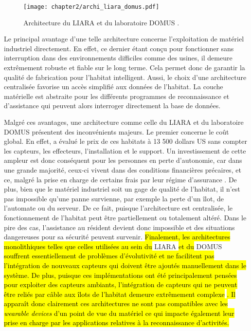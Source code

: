 \begin{figure}[H]
	\centering
	\texttt{[image: chapter2/archi\_liara\_domus.pdf]}
	\caption[Architecture du \acs{LIARA} et du laboratoire \acs{DOMUS}.]{Architecture du \acs{LIARA} \citep{Bouchard2014} et du laboratoire \acs{DOMUS} \citep{Giroux2009}.}
	\label{fig:archi_liara_domus}
\end{figure}

Le principal avantage d'une telle architecture concerne l'exploitation de matériel industriel directement. En effet, ce dernier étant conçu pour fonctionner sans interruption dans des environnements difficiles comme des usines, il demeure extrêmement robuste et fiable sur le long terme. Cela permet donc de garantir la qualité de fabrication pour l'habitat intelligent. Aussi, le choix d'une architecture centralisée favorise un accès simplifié aux données de l'habitat. La couche matérielle est abstraite pour les différents programmes de reconnaissance et d'assistance qui peuvent alors interroger directement la base de données.

Malgré ces avantages, une architecture comme celle du \acs{LIARA} et du laboratoire \acs{DOMUS} présentent des inconvénients majeurs. Le premier concerne le coût global. En effet, \cite{Plantevin2018a} a évalué le prix de ces habitats à 13 500 dollars US sans compter les capteurs, les effecteurs, l'installation et le support. Un investissement de cette ampleur est donc conséquent pour les personnes en perte d'autonomie, car dans une grande majorité, ceux-ci vivent dans des conditions financières précaires, et ce, malgré la prise en charge de certains frais par leur régime d'assurance \citep{AlzheimersAssociation2018}. De plus, bien que le matériel industriel soit un gage de qualité de l'habitat, il n'est pas impossible qu'une panne survienne, par exemple la perte d'un îlot, de l'automate ou du serveur. De ce fait, puisque l'architecture est centralisée, le fonctionnement de l'habitat peut être partiellement ou totalement altéré. Dans le pire des cas, l'assistance au résident devient donc impossible et des situations dangereuses pour sa sécurité peuvent survenir. \hl{Finalement, les architectures monolithiques telles que celles utilisées au sein du} \acs{LIARA} \hl{et du} \acs{DOMUS} \hl{souffrent essentiellement de problèmes d'évolutivité et ne facilitent pas l'intégration de nouveaux capteurs qui doivent être ajoutés manuellement dans le système. De plus, puisque ces implémentations ont été principalement pensées pour exploiter des capteurs ambiants, l'intégration de capteurs qui ne peuvent être reliés par câble aux îlots de l'habitat demeure extrêmement complexe} \citep{Plantevin2018a}\hl{. Il apparaît donc clairement ces architectures ne sont pas compatibles avec les \textit{wearable devices} d'un point de vue du matériel ce qui impacte également leur prise en charge par les applications relatives à la reconnaissance d'activités.}

